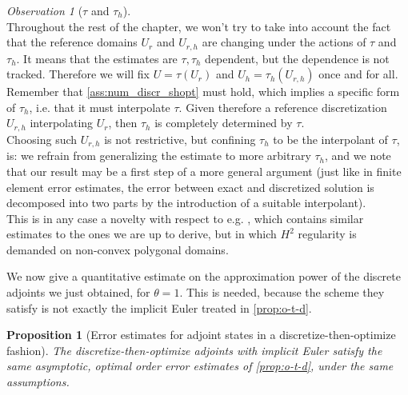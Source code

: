 \documentclass[english,a4paper,9pt,oneside]{scrbook}	%
\theoremstyle{break}
\newtheorem{prop}[equation]{Proposition}
\theoremstyle{remark}
\newtheorem{obs}[equation]{Observation}
\begin{document}
\begin{obs}[$\tau$ and $\tau_h$]
\label{obs:tau_vs_tau_h}
\mbox{}\\
Throughout the rest of the chapter, we won't try to take into account the fact that the reference domains $U_r$ and $U_{r,h}$ are changing under the actions of $\tau$ and $\tau_h$. It means that the estimates are $\tau, \tau_h$ dependent, but the dependence is not tracked. Therefore we will fix $U = \tau(U_r)$ and $U_h=\tau_h(U_{r,h})$ once and for all. Remember that \cref{ass:num_discr_shopt} must hold, which implies a specific form of $\tau_h$, i.e. that it must interpolate $\tau$. Given therefore a reference discretization $U_{r,h}$ interpolating $U_r$, then $\tau_h$ is completely determined by $\tau$. \mbox{}\\

Choosing such $U_{r,h}$ is not restrictive, but confining $\tau_h$ to be the interpolant of $\tau$, is: we refrain from generalizing the estimate to more arbitrary $\tau_h$, and we note that our result may be a first step of a more general argument (just like in finite element error estimates, the error between exact and discretized solution is decomposed into two parts by the introduction of a suitable interpolant).  \mbox{}\\

This is in any case a novelty with respect to e.g. \cite{paganini}, which contains similar estimates to the ones we are up to derive, but in which $H^2$ regularity is demanded on non-convex polygonal domains. \mbox{}\\
\end{obs}

We now give a quantitative estimate on the approximation power of the discrete adjoints we just obtained, for $\theta = 1$. This is needed, because the scheme they satisfy is not exactly the implicit Euler treated in \cref{prop:o-t-d}.

\begin{prop}[Error estimates for adjoint states in a discretize-then-optimize fashion]
\label{prop:d-t-o_estimates}
The discretize-then-optimize adjoints with implicit Euler satisfy the same asymptotic, optimal order error estimates of \cref{prop:o-t-d}, under the same assumptions.
\end{prop}
\end{document}

